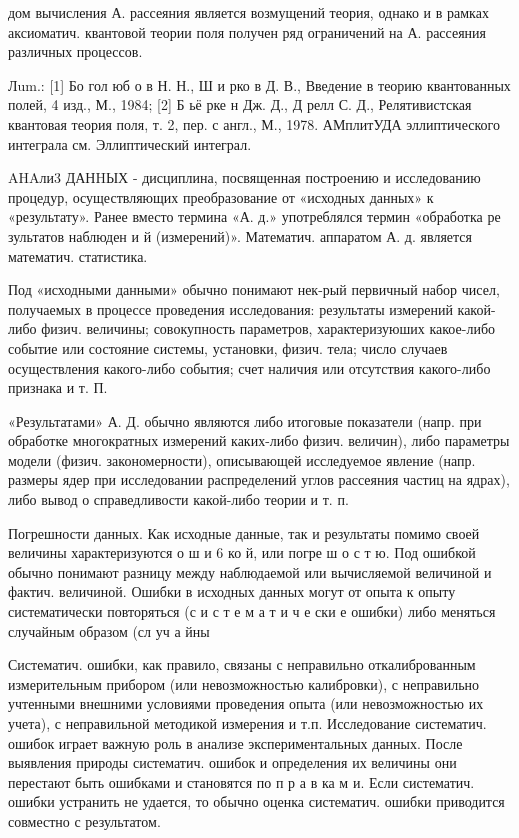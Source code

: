 \documentclass[10pt]{article}
\begin{document}
дом вычисления А. рассеяния является возмущений теория, однако и в рамках аксиоматич. квантовой теории поля получен ряд ограничений на А. рассеяния различных процессов.



Лum.: [1] Бо гол юб о в Н. Н., Ш и рко в Д. В., Введение в теорию квантованных полей, 4 изд., М., 1984; [2] Б ьё рке н Дж. Д., Д релл С. Д., Релятивистская квантовая теория поля, т. 2, пер. с англ., М., 1978. АМплитУДА эллиптического интеграла см. Эллиптический интеграл.



AHAли3 ДАНHЫХ - дисциплина, посвященная построению и исследованию процедур, осуществляющих преобразование от «исходных данных» к «результату». Ранее вместо термина «А. д.» употреблялся термин «обработка ре зультатов наблюден и й (измерений)». Математич. аппаратом А. д. является математич. статистика.



Под «исходными данными» обычно понимают нек-рый первичный набор чисел, получаемых в процессе проведения исследования: результаты измерений какой-либо физич. величины; совокупность параметров, характеризуюших какое-либо событие или состояние системы, установки, физич. тела; число случаев осуществления какого-либо события; счет наличия или отсутствия какого-либо признака и т. П.



«Результатами» А. Д. обычно являются либо итоговые показатели (напр. при обработке многократных измерений каких-либо физич. величин), либо параметры модели (физич. закономерности), описывающей исследуемое явление (напр. размеры ядер при исследовании распределений углов рассеяния частиц на ядрах), либо вывод о справедливости какой-либо теории и т. п.



Погрешности данных. Как исходные данные, так и результаты помимо своей величины характеризуются о ш и 6 ко й, или погре ш о с т ю. Под ошибкой обычно понимают разницу между наблюдаемой или вычисляемой величиной и фактич. величиной. Ошибки в исходных данных могут от опыта к опыту систематически повторяться (с и с т е м а т и ч е ски е ошибки) либо меняться случайным образом (сл уч а йны



Систематич. ошибки, как правило, связаны с неправильно откалиброванным измерительным прибором (или невозможностью калибровки), с неправильно учтенными внешними условиями проведения опыта (или невозможностью их учета), с неправильной методикой измерения и т.п. Исследование систематич. ошибок играет важную роль в анализе экспериментальных данных. После выявления природы систематич. ошибок и определения их величины они перестают быть ошибками и становятся по п р а в ка м и. Если систематич. ошибки устранить не удается, то обычно оценка систематич. ошибки приводится совместно с результатом.
\end{document}
